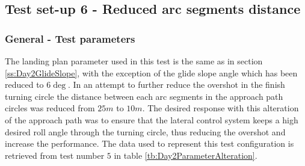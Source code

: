 %
\subsection{Test set-up 6 - Reduced arc segments distance}\label{ss:Day2ArcDistance}
\subsubsection{General - Test parameters}
The landing plan parameter used in this test is the same as in section \ref{ss:Day2GlideSlope}, with the exception of the glide slope angle which has been reduced to $6 \deg$. In an attempt to further reduce the overshot in the finish turning circle the distance between each arc segments in the approach path circles was reduced from $25 m$ to $10 m$. The desired response with this alteration of the approach path was to ensure that the lateral control system keeps a high desired roll angle through the turning circle, thus reducing the overshot and increase the performance. The data used to represent this test configuration is retrieved from test number $5$ in table \ref{tb:Day2ParameterAlteration}.
